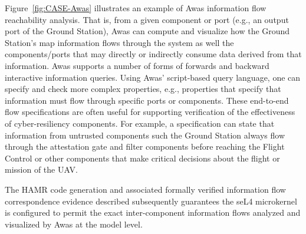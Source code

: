 Figure~\ref{fig:CASE-Awas} illustrates an example of Awas information flow reachability analysis.
That is, from a given component or port (e.g., an output port of the Ground Station),
Awas can compute and visualize how the Ground Station’s map information flows through the system
as well the components/ports that may directly or indirectly consume data derived from that information.
Awas supports a number of forms of forwards and backward interactive information queries.
Using Awas' script-based query language, one can specify and check more complex properties, e.g.,
properties that specify that information must flow through specific ports or components.
These end-to-end flow specifications are often useful for supporting verification of the
effectiveness of cyber-resiliency components.   For example, a specification can state that
information from untrusted components such the Ground Station always flow through the
attestation gate and filter components before reaching the Flight Control or other components
that make critical decisions about the flight or mission of the UAV.

The HAMR code generation and associated formally verified information
flow correspondence evidence described subsequently
guarantees the seL4 microkernel is configured to permit the exact
inter-component information flows analyzed and visualized by Awas at
the model level.